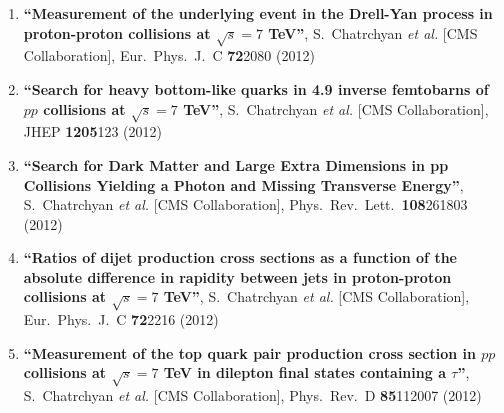 \begin{enumerate}
\item%
{\bf ``Measurement of the underlying event in the Drell-Yan process in proton-proton collisions at $\sqrt{s}=7$ TeV''}, 
  S.~Chatrchyan {\it et al.}  [CMS Collaboration], 
Eur.\ Phys.\ J.\ C {\bf 72}2080 (2012) %


\item%
{\bf ``Search for heavy bottom-like quarks in 4.9 inverse femtobarns of $pp$ collisions at $\sqrt{s}=7$ TeV''}, 
  S.~Chatrchyan {\it et al.}  [CMS Collaboration], 
JHEP {\bf 1205}123 (2012) %


\item%
{\bf ``Search for Dark Matter and Large Extra Dimensions in pp Collisions Yielding a Photon and Missing Transverse Energy''}, 
  S.~Chatrchyan {\it et al.}  [CMS Collaboration], 
Phys.\ Rev.\ Lett.\  {\bf 108}261803 (2012) %


\item%
{\bf ``Ratios of dijet production cross sections as a function of the absolute difference in rapidity between jets in proton-proton collisions at $\sqrt{s}=7$ TeV''}, 
  S.~Chatrchyan {\it et al.}  [CMS Collaboration], 
Eur.\ Phys.\ J.\ C {\bf 72}2216 (2012) %


\item%
{\bf ``Measurement of the top quark pair production cross section in $pp$ collisions at $\sqrt{s} = 7$ TeV in dilepton final states containing a $\tau$''}, 
  S.~Chatrchyan {\it et al.}  [CMS Collaboration], 
Phys.\ Rev.\ D {\bf 85}112007 (2012) %



\end{enumerate}
